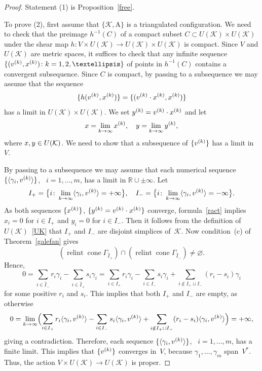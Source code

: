 \documentclass[a4paper]{amsart}
\theoremstyle{definition}
\theoremstyle{remark}
\numberwithin{equation}{section}
\def\R{\mathbb R}
\def\R{\mathbb R}
\def\sK{\mathcal K}
\newcommand{\mb}[1]{{\textbf {\textit#1}}}
\def\cone{\mathop{\mathrm{cone}}}
\def\relint{\mathop{\mathrm{relint}}}
\newcommand{\<}{\langle}
\renewcommand{\>}{\rangle}
\begin{document}
\begin{proof}
Statement (1) is Proposition~\ref{free}.

To prove (2), first assume that $\{\sK,\mathrm A\}$ is a triangulated configuration. We need to check that the preimage $h^{-1}(C)$ of a compact subset $C\subset U(\sK)\times U(\sK)$ under the shear map $h\colon V\times U(\sK)\to U(\sK)\times U(\sK)$ is compact. Since $V$ and $U(\sK)$ are metric spaces, it suffices to check that any infinite sequence $\{(\mb v^{(k)},\mb x^{(k)})\colon k=1,2,\ldots\}$ of points in $h^{-1}(C)$ contains a convergent subsequence. Since $C$ is compact, by passing to a subsequence we may assume that the sequence
\[
  \{h(\mb v^{(k)},\mb x^{(k)})\}=\{(\mb v^{(k)}\cdot \mb x^{(k)},\mb x^{(k)})\}
\]
has a limit in $U(\sK)\times U(\sK)$. We set $\mb y^{(k)}=\mb v^{(k)}\cdot\mb x^{(k)}$  
and let
\[
  \mb x=\lim_{k\to\infty}\mb x^{(k)},\quad \mb y=\lim_{k\to\infty}\mb y^{(k)},
\]
where $\mb x,\mb y\in U(\sK)$. We need to show that a subsequence of $\{\mb v^{(k)}\}$ has  a limit in~$V$.

By passing to a subsequence we may assume
that each numerical sequence $\{\langle\gamma_i,\mb v^{(k)}\rangle\}$, \ $i=1,\ldots,m$, has a
limit in $\R\cup{\pm\infty}$. Let
\[
  I_+=\bigl\{i\colon\lim_{k\to\infty}\langle\gamma_i,\mb v^{(k)}\rangle= +\infty\bigr\},
\quad
  I_-=\bigl\{i\colon\lim_{k\to\infty}\langle\gamma_i,\mb v^{(k)}\rangle= -\infty\bigr\}.
\]
As both sequences $\{\mb x^{(k)}\}$, $\{\mb y^{(k)}=\mb v^{(k)}\cdot\mb x^{(k)}\}$ converge, formula~\eqref{ract}  implies $x_i=0$ for $i\in I_+$ and $y_i=0$ for $i\in I_-$. Then it follows from the definition of $U(\sK)$~\eqref{UK} that $I_+$ and $I_-$ are disjoint simplices of~$\sK$. Now condition~(c) of Theorem~\ref{galefan} gives
\[
  (\relint\cone\Gamma_{\widehat I_+})\cap(\relint\cone\Gamma_{\widehat I_-})\ne\varnothing.
\]
Hence,
\[
  0=\sum_{i\in\widehat I_-}r_i\gamma_i  -\sum_{i\in\widehat I_+}s_i\gamma_i=
  \sum_{i\in I_+}r_i\gamma_i-\sum_{i\in I_-}s_i\gamma_i
  +\sum_{i\notin I_+\sqcup I_-}(r_i-s_i)\gamma_i
\]
for some positive $r_i$ and $s_i$. This implies that both $I_+$ and $I_-$ are empty, as otherwise
\[
  0=\lim_{k\to\infty}\Bigl(\sum_{i\in I_+}r_i\langle\gamma_i,\mb v^{(k)}\rangle
  -\sum_{i\in I_-}s_i\langle\gamma_i,\mb v^{(k)}\rangle+
  \sum_{i\notin I_+\sqcup I_-}(r_i-s_i)\langle\gamma_i,\mb v^{(k)}\rangle\Bigr)=+\infty,
\]
giving a contradiction. Therefore, each sequence $\{\langle\gamma_i,\mb v^{(k)}\rangle\}$, \ $i=1,\ldots,m$, has a finite limit. This implies that $\{\mb v^{(k)}\}$ converges in~$V$, because $\gamma_1,\ldots,\gamma_m$ span~$V^*$. Thus, the action $V\times U(\sK)\to U(\sK)$ is proper.


\end{proof}
\end{document}
